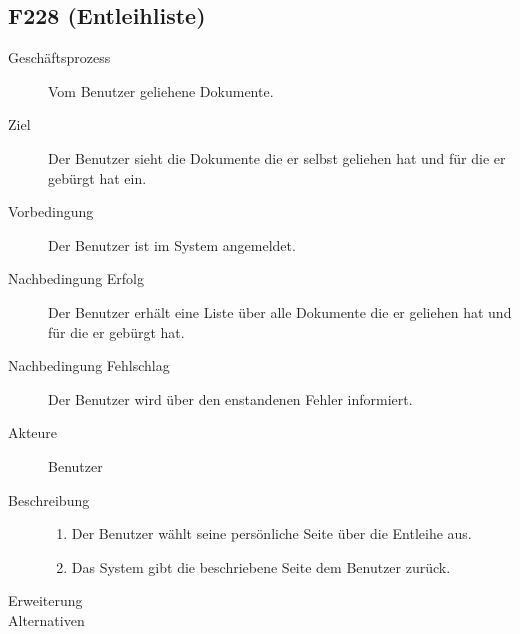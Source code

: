 \subsection{F228 (Entleihliste)}
\begin{description}
  \item[Geschäftsprozess]Vom Benutzer geliehene Dokumente.
  \item[Ziel]Der Benutzer sieht die Dokumente die er selbst geliehen hat und für die er gebürgt hat ein.
  \item[Vorbedingung]Der Benutzer ist im System angemeldet.
  \item[Nachbedingung Erfolg]Der Benutzer erhält eine Liste über alle Dokumente die er geliehen hat und für die er gebürgt hat.
  \item[Nachbedingung Fehlschlag]Der Benutzer wird über den enstandenen Fehler informiert.
  \item[Akteure]Benutzer
  \item[Beschreibung]\hfill
    \begin{enumerate}
      \item Der Benutzer wählt seine persönliche Seite über die Entleihe aus.
      \item Das System gibt die beschriebene Seite dem Benutzer zurück.
    \end{enumerate}
  \item[Erweiterung]
  \item[Alternativen]
\end{description}

